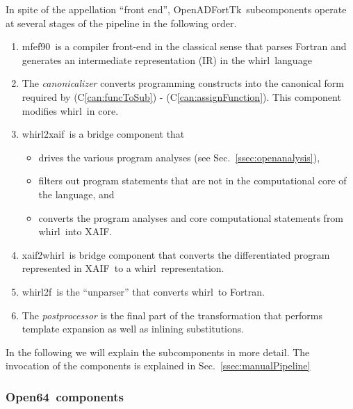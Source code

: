 \documentclass[11pt]{article}
\newcommand{\mfefninety}{mfef90}
\newcommand{\OpenADFortTk}{OpenADFortTk}
\newcommand{\OpenSixtyFour}{Open64}
\newcommand{\xaif}{XAIF}
\newcommand{\whirl}{whirl}
\newcommand{\whirlToxaif}{whirl2xaif}
\newcommand{\whirlTof}{whirl2f}
\newcommand{\xaifTowhirl}{xaif2whirl}
\newcommand{\refcan}[1]{(C\ref{#1})}
\newcommand{\refsec}[1]{{Sec.~\ref{#1}}}
\begin{document}
In spite of the appellation ``front end'', \OpenADFortTk\ subcomponents
operate at several stages of the pipeline in the following order.

\begin{enumerate}	
\item \mfefninety\ is a compiler front-end in the classical sense that parses
  Fortran and generates an intermediate representation (IR)
  in the \whirl\ language

\item The {\em canonicalizer} converts  
  programming constructs into the canonical form required by 
  \refcan{can:funcToSub} - \refcan{can:assignFunction}. 
  This component modifies \whirl\ in core.

\item \whirlToxaif\ is a bridge component that
  \begin{itemize}
  \item drives the various program analyses (see \refsec{ssec:openanalysis}),

  \item filters out program statements that are not in the
    computational core of the language, and 

  \item converts the program analyses and core computational
    statements from \whirl\ into \xaif.
  \end{itemize}

\item \xaifTowhirl\ is bridge component that converts the 
  differentiated program represented in \xaif\ 
  to a \whirl\ representation.

\item \whirlTof\ is the ``unparser'' that converts \whirl\ to
  Fortran.

\item The {\em postprocessor} is the  final part of the transformation that
  performs template expansion as well as inlining substitutions.

\end{enumerate}

In the following we will explain the subcomponents in more detail.
The invocation of the components is explained in
\refsec{ssec:manualPipeline}

\subsubsection{\OpenSixtyFour\ components} \label{sssec:mfef}
\end{document}
